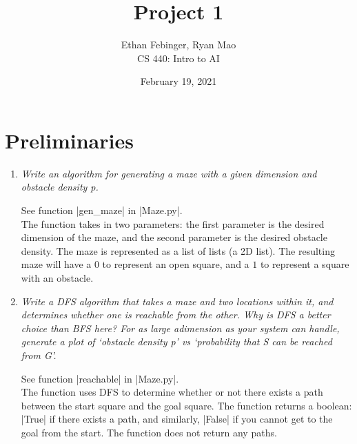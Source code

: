 \documentclass[12pt, twoside]{article}
\newcommand{\name}{Ethan Febinger, Ryan Mao}
\newcommand{\class}{CS 440: Intro to AI}
\newcommand{\hwTitle}{Project 1} %
\newcommand{\due}{February 19, 2021} %
\begin{document}
 
 
\title{\hwTitle} %
\author{\name\\  %
\class} %
\date{\due}
 
\maketitle

\section{Preliminaries}
\begin{enumerate}
    \item 
        \textit{Write an algorithm for generating a maze with a given dimension and obstacle density p.}
        
        \vspace{4mm}
        See function \cverb|gen_maze| in \cverb|Maze.py|. \\
        The function takes in two parameters: the first parameter is the desired dimension of the maze, and the second parameter is the desired obstacle density. The maze is represented as a list of lists (a 2D list). The resulting maze will have a $0$ to represent an open square, and a $1$ to represent a square with an obstacle. 

    \item 
        \textit{Write  a  DFS  algorithm  that  takes  a  maze  and  two  locations  within  it,  and             determines whether  one  is  reachable  from  the  other.  Why  is  DFS  a  better  choice  than  BFS  here?  For  as  large  adimension as your system can handle,  generate a plot of ‘obstacle density p’ vs ‘probability that S can be reached from G’.}

        \vspace{4mm}
        See function \cverb|reachable| in \cverb|Maze.py|. \\
        The function uses DFS to determine whether or not there exists a path between the start square and the goal square. The function returns a boolean: \cverb|True| if there exists a path, and similarly, \cverb|False| if you cannot get to the goal from the start. The function does not return any paths.


\end{enumerate}
\end{document}
